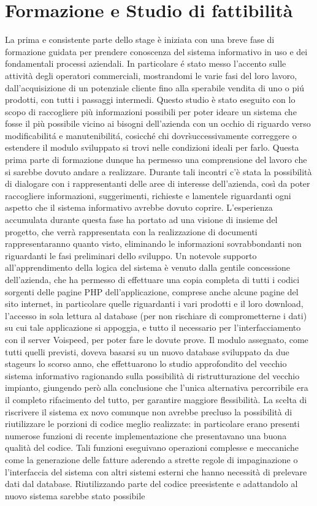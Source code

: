 \section{Formazione e Studio di fattibilit\` a}
La prima e consistente parte dello stage \`e iniziata con una breve fase di formazione guidata per prendere conoscenza del sistema informativo in uso e dei fondamentali processi aziendali. In particolare \'e stato messo l'accento sulle attivit\`a degli operatori commerciali, mostrandomi le varie fasi del loro lavoro, dall'acquisizione di un potenziale cliente fino alla sperabile vendita di uno o pi\'u prodotti, con tutti i passaggi intermedi. Questo studio \`e stato eseguito con lo scopo di raccogliere pi\`u informazioni possibili per poter ideare un sistema che fosse il pi\`u possibile vicino ai bisogni dell'azienda con un occhio di riguardo verso modificabilit\'a e manutenibilit\'a, cosicch\'e chi dovr\` successivamente correggere o estendere il modulo sviluppato si trovi nelle condizioni ideali per farlo. Questa prima parte di formazione dunque ha permesso una comprensione del lavoro che si sarebbe dovuto andare a realizzare. Durante tali incontri c'\`e stata la possibilit\`a di dialogare con i rappresentanti delle aree di interesse dell'azienda, cos\`i da poter raccogliere informazioni, suggerimenti, richieste e lamentele riguardanti ogni aspetto che il sistema informativo avrebbe dovuto coprire. L'esperienza accumulata durante questa fase ha portato ad una visione di insieme del progetto, che verr\`a rappresentata con la realizzazione di documenti rappresentaranno quanto visto, eliminando le informazioni sovrabbondanti non riguardanti le fasi preliminari dello sviluppo. Un notevole supporto all'apprendimento della logica del sistema \`e venuto dalla gentile concessione dell'azienda, che ha permesso di effettuare una copia completa di tutti i codici sorgenti delle pagine PHP dell'applicazione, comprese anche alcune pagine del sito internet, in particolare quelle riguardanti i vari prodotti e il loro download, l'accesso in sola lettura al database (per non rischiare di comprometterne i dati) su cui tale applicazione si appoggia, e tutto il necessario per l'interfacciamento con il server Voispeed, per poter fare le dovute prove. Il modulo assegnato, come tutti quelli previsti, doveva basarsi su un nuovo database sviluppato da due stageurs lo scorso anno, che effettuarono lo studio approfondito del vecchio sistema informativo ragionando sulla possibilit\`a di ristrutturazione del vecchio impianto, giungendo per\`o alla conclusione che l'unica alternativa percorribile era il completo rifacimento del tutto, per garantire maggiore flessibilit\`a. La scelta di riscrivere il sistema ex novo comunque non avrebbe precluso la possibilit\`a di riutilizzare le porzioni di codice meglio realizzate: in particolare erano presenti numerose funzioni di recente implementazione che presentavano una buona qualit\`a del codice. Tali funzioni eseguivano operazioni complesse e meccaniche come la generazione delle fatture aderendo a strette regole di impaginazione o l'interfaccia del sistema con altri sistemi esterni che hanno necessit\`a di prelevare dati dal database. Riutilizzando parte del codice preesistente e adattandolo al nuovo sistema sarebbe stato possibile  
